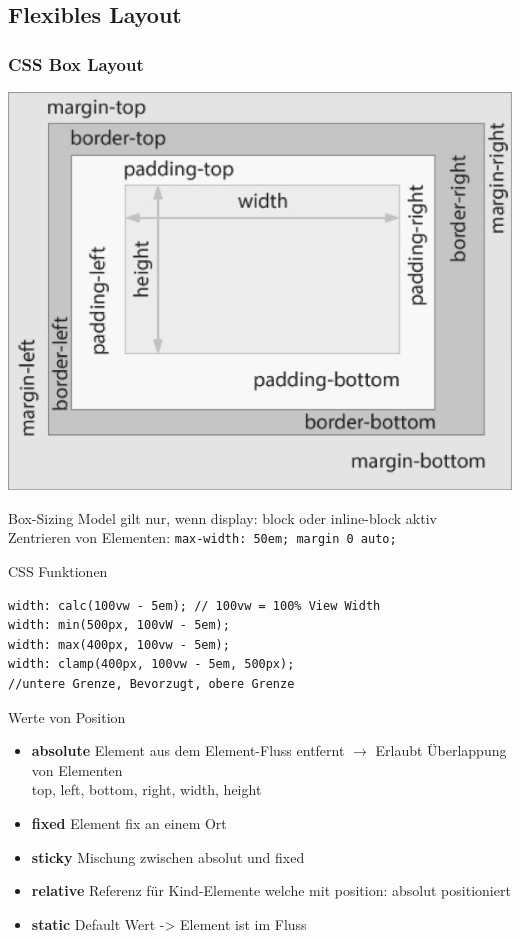 \subsection{Flexibles Layout}

\subsubsection{CSS Box Layout}
\begin{minipage}{0.7\linewidth}
\begin{center}
    \includegraphics[width=\linewidth]{graphic/responsive/boxmodel.png}
\vspace{-8pt}
\end{center}
\end{minipage}
\begin{minipage}{0.287\linewidth}
    Box-Sizing Model gilt nur, wenn display: block oder inline-block aktiv\\
    Zentrieren von Elementen: \texttt{max-width: 50em; margin 0 auto;}
\end{minipage}
\textcolor{subsectioncolor}{CSS Funktionen}
\begin{lstlisting}
width: calc(100vw - 5em); // 100vw = 100% View Width
width: min(500px, 100vW - 5em);
width: max(400px, 100vw - 5em);
width: clamp(400px, 100vw - 5em, 500px);
//untere Grenze, Bevorzugt, obere Grenze
\end{lstlisting}
\textcolor{subsectioncolor}{Werte von Position}
\begin{itemize}
    \item \textbf{absolute} Element aus dem Element-Fluss entfernt $\rightarrow$ Erlaubt Überlappung von Elementen \\
    top, left, bottom, right, width, height
    \item \textbf{fixed} Element fix an einem Ort
    \item \textbf{sticky} Mischung zwischen absolut und fixed
    \item \textbf{relative} Referenz für Kind-Elemente welche mit position: absolut positioniert
    \item \textbf{static} Default Wert -> Element ist im Fluss
\end{itemize}

